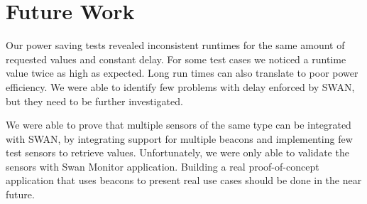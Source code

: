 \section{Future Work}
Our power saving tests revealed inconsistent runtimes for the same amount of requested values and constant delay. For some test cases we noticed a runtime value twice as high as expected.
Long run times can also translate to poor power efficiency. We were able to identify few problems with delay enforced by SWAN, but they need to be further investigated.

We were able to prove that multiple sensors of the same type can be integrated with SWAN, by integrating support for multiple beacons and implementing few test sensors to retrieve values.
Unfortunately, we were only able to validate the sensors with Swan Monitor\cite{swan_monitor} application. Building a real proof-of-concept application that uses beacons to present real use cases should be done in the near future.

